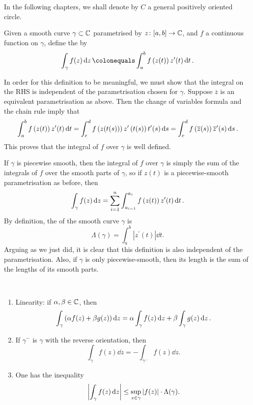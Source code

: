 In the following chapters, we shall denote by $C$ a general positively oriented circle.

\begin{definition}
Given a smooth curve $\gamma\subset\mathbb C$ parametrised by $z\colon[a,b]\to\mathbb C$, and $f$ a continuous function on $\gamma$, define the  by
\begin{equation}
\int_{\gamma}f(z)\dd{z}\colonequals\int_{a}^{b}f\brac{z(t)}z^\prime(t)\dd{t}.
\end{equation}
\end{definition}

In order for this definition to be meaningful, we must show that the integral on the RHS is independent of the parametrisation chosen for $\gamma$.
Suppose $\overline{z}$ is an equivalent parametrisation as above. Then the change of variables formula and the chain rule imply that
\[\int_{a}^{b}f\left(z(t)\right)z^\prime(t)\dd{t}
=\int_{c}^{d}f\left(z(t(s))\right)z^\prime\left(t(s)\right)t^\prime(s)\dd{s}
=\int_{c}^{d}f\left(\overline{z}(s)\right)\overline{z}^\prime(s)\dd{s}.\]
This proves that the integral of $f$ over $\gamma$ is well defined.

If $\gamma$ is piecewise smooth, then the integral of $f$ over $\gamma$ is simply the sum of the integrals of $f$ over the smooth parts of $\gamma$, so if $z(t)$ is a piecewise-smooth parametrisation as before, then
\[\int_{\gamma}f(z)\dd{z}=\sum_{i=1}^{n}\int_{a_{i-1}}^{a_i}f\left(z(t)\right)z^\prime(t)\dd{t}.\]
By definition, the  of the smooth curve $\gamma$ is
\[\Lambda(\gamma)=\int_{a}^{b}|z^\prime(t)|\dd{t}.\]
Arguing as we just did, it is clear that this definition is also independent of the parametrisation. 
Also, if $\gamma$ is only piecewise-smooth, then its length is the sum of the lengths of its smooth parts.

\begin{lemma} \
\begin{enumerate}[label=(\roman*)]
\item Linearity: if $\alpha,\beta\in\mathbb C$, then
\[\int_{\gamma}\left(\alpha f(z)+\beta g(z)\right)\dd{z}=\alpha\int_{\gamma}f(z)\dd{z}+\beta\int_{\gamma}g(z)\dd{z}.\]
\item If $\gamma^-$ is $\gamma$ with the reverse orientation, then
\[\int_{\gamma}f(z)\dd{z}=-\int_{\gamma^-}f(z)\dd{z}.\]
\item One has the inequality
\[\left|\int_{\gamma}f(z)\dd{z}\right|\le\sup_{z\in\gamma}|f(z)|\cdot\Lambda(\gamma).\]
\end{enumerate}
\end{lemma}

